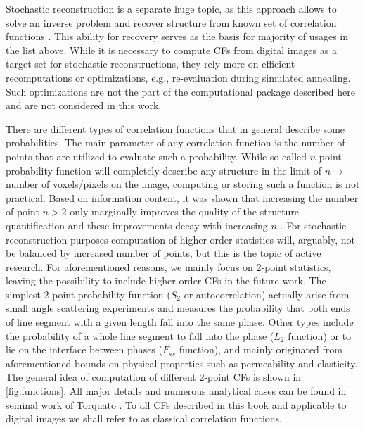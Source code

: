 \documentclass[reprint,amsmath,amssymb,aps,pre,showkeys,showpacs,nofootinbib]{revtex4-1}
\begin{document}
Stochastic reconstruction is a separate huge topic, as this approach allows to
solve an inverse problem and recover structure from known set of correlation
functions
\cite{Adler_recon,Y-T,vcapek2009stochastic,hasanabadi20163d,Havelka,feng2018reconstruction,tahmasebiPRL,EPL2,thovert2011grain,tensorPRE}. This
ability for recovery serves as the basis for majority of usages in the list
above. While it is necessary to compute CFs from digital images as a target set
for stochastic reconstructions, they rely more on efficient recomputations or
optimizations, e.g., re-evaluation during simulated annealing. Such
optimizations are not the part of the computational package described here and
are not considered in this work.

There are different types of correlation functions that in general describe some
probabilities. The main parameter of any correlation function is the number of
points that are utilized to evaluate such a probability. While so-called
$n$-point probability function \cite{Torquato_book} will completely describe any
structure in the limit of $n \rightarrow$ number of voxels/pixels on the image,
computing or storing such a function is not practical. Based on information
content, it was shown that increasing the number of point $n > 2$ only
marginally improves the quality of the structure quantification and these
improvements decay with increasing $n$ \cite{yao1993high,Gommes2}. For stochastic reconstruction purposes
computation of higher-order statistics will, arguably, not be balanced by
increased number of points, but this is the topic of active research. For
aforementioned reasons, we mainly focus on 2-point statistics, leaving the
possibility to include higher order CFs in the future work. The simplest 2-point
probability function ($S_2$ or autocorrelation) actually arise from small angle
scattering experiments and measures the probability that both ends of line
segment with a given length fall into the same phase. Other types include the
probability of a whole line segment to fall into the phase ($L_2$ function) or
to lie on the interface between phases ($F_{ss}$ function), and mainly originated
from aforementioned bounds on physical properties such as permeability and
elasticity. The general idea of computation of different 2-point CFs is shown in
\cref{fig:functions}. All major details and numerous analytical cases can be
found in seminal work of Torquato \cite{Torquato_book}. To all CFs described in this
book and applicable to digital images we shall refer to as classical correlation
functions.
\end{document}
